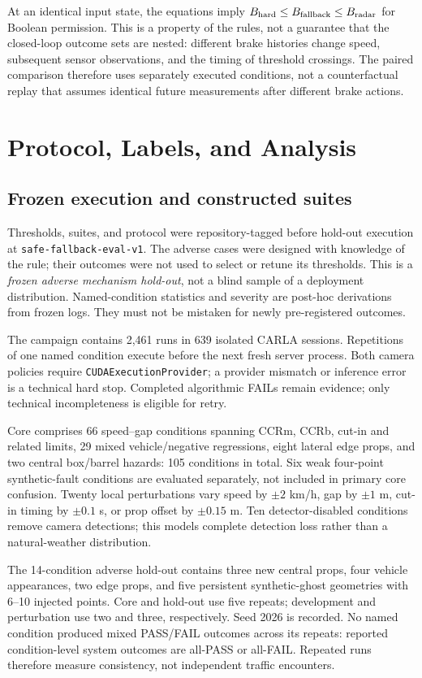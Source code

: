 \documentclass[conference]{IEEEtran}
\begin{document}
At an identical input state, the equations imply
$B_{\rm hard}\leq B_{\rm fallback}\leq B_{\rm radar}$ for Boolean permission.
This is a property of the rules, not a guarantee that the closed-loop outcome
sets are nested: different brake histories change speed, subsequent sensor
observations, and the timing of threshold crossings. The paired comparison
therefore uses separately executed conditions, not a counterfactual replay
that assumes identical future measurements after different brake actions.

\section{Protocol, Labels, and Analysis}
\subsection{Frozen execution and constructed suites}
Thresholds, suites, and protocol were repository-tagged before hold-out
execution at \texttt{safe-fallback-eval-v1}. The adverse cases were designed with
knowledge of the rule; their outcomes were not used to select or retune its
thresholds. This is a \emph{frozen adverse mechanism hold-out}, not a blind sample
of a deployment distribution. Named-condition statistics and severity are
post-hoc derivations from frozen logs. They must not be mistaken for newly
pre-registered outcomes.

The campaign contains 2,461 runs in 639 isolated CARLA sessions. Repetitions of
one named condition execute before the next fresh server process. Both camera
policies require \texttt{CUDAExecutionProvider}; a provider mismatch or inference
error is a technical hard stop. Completed algorithmic FAILs remain evidence;
only technical incompleteness is eligible for retry.

Core comprises 66 speed--gap conditions spanning CCRm, CCRb, cut-in and related
limits, 29 mixed vehicle/negative regressions, eight lateral edge props, and two
central box/barrel hazards: 105 conditions in total. Six weak four-point
synthetic-fault conditions are evaluated separately, not included in primary
core confusion. Twenty local perturbations vary speed by $\pm2$ km/h, gap by
$\pm1$ m, cut-in timing by $\pm0.1$ s, or prop offset by $\pm0.15$ m. Ten
detector-disabled conditions remove camera detections; this models complete
detection loss rather than a natural-weather distribution.

The 14-condition adverse hold-out contains three new central props, four vehicle
appearances, two edge props, and five persistent synthetic-ghost geometries with
6--10 injected points. Core and hold-out use five repeats; development and
perturbation use two and three, respectively. Seed 2026 is recorded. No named
condition produced mixed PASS/FAIL outcomes across its repeats: reported
condition-level system outcomes are all-PASS or all-FAIL. Repeated runs therefore
measure consistency, not independent traffic encounters.
\end{document}
